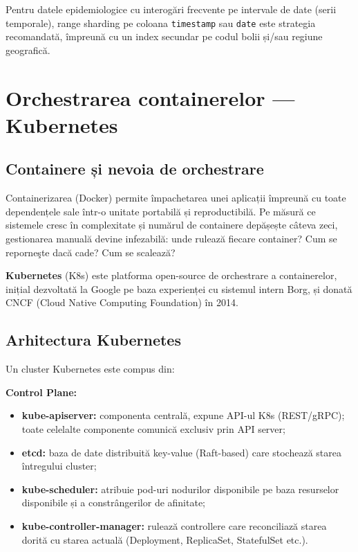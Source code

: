 \begin{observatie}
Pentru datele epidemiologice cu interogări frecvente pe intervale de date
(serii temporale), range sharding pe coloana \texttt{timestamp} sau
\texttt{date} este strategia recomandată, împreună cu un index secundar
pe codul bolii și/sau regiune geografică.
\end{observatie}

\section{Orchestrarea containerelor — Kubernetes}
\label{sec:kubernetes}

\subsection{Containere și nevoia de orchestrare}
\label{subsec:containere}

Containerizarea (Docker) permite împachetarea unei aplicații împreună cu
toate dependențele sale într-o unitate portabilă și reproductibilă.
Pe măsură ce sistemele cresc în complexitate și numărul de containere
depășește câteva zeci, gestionarea manuală devine infezabilă: unde rulează
fiecare container? Cum se reporneşte dacă cade? Cum se scalează?

\textbf{Kubernetes} (K8s) \cite{burns2016kubernetes, kubernetes2024} este
platforma open-source de orchestrare a containerelor, inițial dezvoltată
la Google pe baza experienței cu sistemul intern Borg, și donată CNCF
(Cloud Native Computing Foundation) în 2014.

\subsection{Arhitectura Kubernetes}
\label{subsec:k8s_arhitectura}

Un cluster Kubernetes este compus din:

\textbf{Control Plane:}
\begin{itemize}
    \item \textbf{kube-apiserver:} componenta centrală, expune API-ul K8s
    (REST/gRPC); toate celelalte componente comunică exclusiv prin API server;
    \item \textbf{etcd:} baza de date distribuită key-value (Raft-based) care
    stochează starea întregului cluster;
    \item \textbf{kube-scheduler:} atribuie pod-uri nodurilor disponibile
    pe baza resurselor disponibile și a constrângerilor de afinitate;
    \item \textbf{kube-controller-manager:} rulează controllere care reconciliază
    starea dorită cu starea actuală (Deployment, ReplicaSet, StatefulSet etc.).
\end{itemize}

